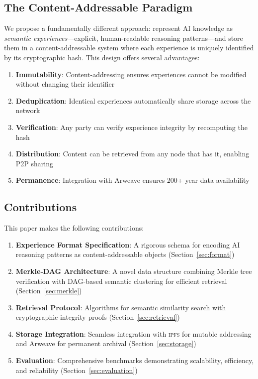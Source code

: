\documentclass[11pt,letterpaper]{article}
\newcommand{\IPFS}{\textsc{ipfs}}
\begin{document}
\subsection{The Content-Addressable Paradigm}

We propose a fundamentally different approach: represent AI knowledge as \emph{semantic experiences}---explicit, human-readable reasoning patterns---and store them in a content-addressable system where each experience is uniquely identified by its cryptographic hash. This design offers several advantages:

\begin{enumerate}
    \item \textbf{Immutability}: Content-addressing ensures experiences cannot be modified without changing their identifier
    \item \textbf{Deduplication}: Identical experiences automatically share storage across the network
    \item \textbf{Verification}: Any party can verify experience integrity by recomputing the hash
    \item \textbf{Distribution}: Content can be retrieved from any node that has it, enabling P2P sharing
    \item \textbf{Permanence}: Integration with Arweave ensures 200+ year data availability
\end{enumerate}

\subsection{Contributions}

This paper makes the following contributions:

\begin{enumerate}
    \item \textbf{Experience Format Specification}: A rigorous schema for encoding AI reasoning patterns as content-addressable objects (Section~\ref{sec:format})

    \item \textbf{Merkle-DAG Architecture}: A novel data structure combining Merkle tree verification with DAG-based semantic clustering for efficient retrieval (Section~\ref{sec:merkle})

    \item \textbf{Retrieval Protocol}: Algorithms for semantic similarity search with cryptographic integrity proofs (Section~\ref{sec:retrieval})

    \item \textbf{Storage Integration}: Seamless integration with \IPFS{} for mutable addressing and Arweave for permanent archival (Section~\ref{sec:storage})

    \item \textbf{Evaluation}: Comprehensive benchmarks demonstrating scalability, efficiency, and reliability (Section~\ref{sec:evaluation})
\end{enumerate}
\end{document}
